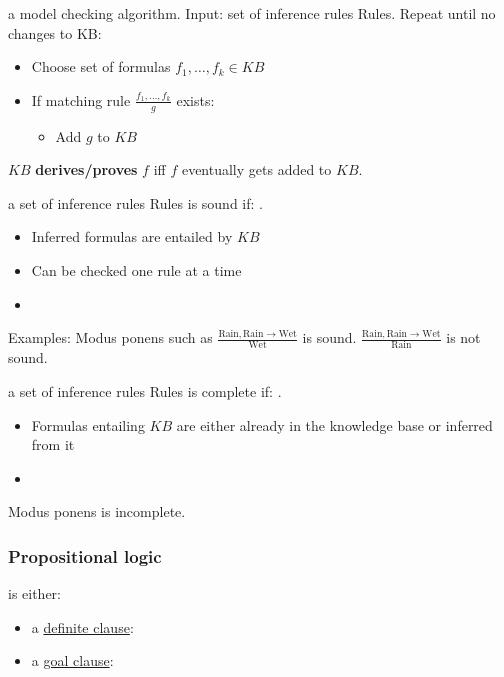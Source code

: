  a model checking algorithm. Input: set of inference
rules Rules. Repeat until no changes to KB:
\begin{itemize}
    \item Choose set of formulas $f_1, \dots, f_k \in KB$
    \item If matching rule $\frac{f_1, \dots, f_k}{g}$ exists:\begin{itemize}
        \item Add $g$ to $KB$
    \end{itemize}
\end{itemize}

 $KB$ \textbf{derives/proves} $f$ iff $f$
eventually gets added to $KB$.

 a set of inference rules Rules is sound if:
.
\begin{itemize}
    \item Inferred formulas are entailed by $KB$
    \item Can be checked one rule at a time
    \item {}
\end{itemize}
Examples:
Modus ponens such as
$\frac{\text{Rain}, \text{Rain} \rightarrow \text{Wet}}{\text{Wet}}$ is sound.
$\frac{\text{Rain}, \text{Rain} \rightarrow \text{Wet}}{\text{Rain}}$ is not sound.

 a set of inference rules Rules is complete if:
.
\begin{itemize}
    \item Formulas entailing $KB$ are either already in the knowledge base or inferred from it
    \item {}
\end{itemize}
Modus ponens is incomplete.

\subsubsection{Propositional logic}

 is either:
\begin{itemize}
    \item a \underline{definite clause}: 
    \item a \underline{goal clause}: 
\end{itemize}


